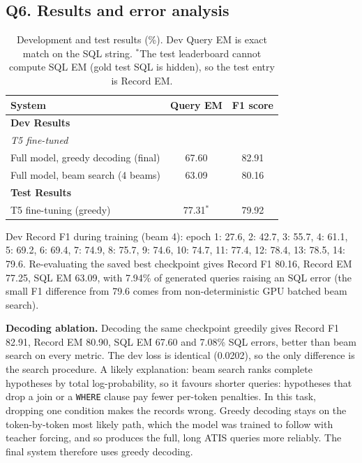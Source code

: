 \documentclass[11pt]{article}
\begin{document}
\subsection*{Q6. Results and error analysis}
\begin{table}[H]
\centering
\begin{tabular}{lcc}
\toprule
System & Query EM & F1 score \\
\midrule
\multicolumn{3}{l}{\textbf{Dev Results}} \\
\multicolumn{3}{l}{\emph{T5 fine-tuned}} \\
Full model, greedy decoding (final) & 67.60 & 82.91 \\
Full model, beam search (4 beams) & 63.09 & 80.16 \\
\midrule
\multicolumn{3}{l}{\textbf{Test Results}} \\
T5 fine-tuning (greedy) & 77.31$^*$ & 79.92 \\
\bottomrule
\end{tabular}
\caption{Development and test results (\%). Dev Query EM is exact match on the SQL string. $^*$The test leaderboard
cannot compute SQL EM (gold test SQL is hidden), so the test entry is Record EM.}
\end{table}

\noindent Dev Record F1 during training (beam 4):
epoch 1: 27.6, 2: 42.7, 3: 55.7, 4: 61.1, 5: 69.2, 6: 69.4, 7: 74.9, 8: 75.7, 9: 74.6, 10: 74.7, 11: 77.4,
12: 78.4, 13: 78.5, 14: 79.6.
Re-evaluating the saved best checkpoint gives Record F1 80.16, Record EM 77.25, SQL EM 63.09, with 7.94\% of
generated queries raising an SQL error (the small F1 difference from 79.6 comes from non-deterministic GPU batched beam search).

\noindent\textbf{Decoding ablation.} Decoding the same checkpoint greedily gives Record F1 82.91, Record EM 80.90,
SQL EM 67.60 and 7.08\% SQL errors, better than beam search on every metric. The dev loss is identical (0.0202),
so the only difference is the search procedure. A likely explanation: beam search ranks complete hypotheses by total log-probability, so it
favours shorter queries: hypotheses that drop a join or a \texttt{WHERE} clause pay fewer per-token penalties.
In this task, dropping one condition makes the records wrong. Greedy decoding stays on the token-by-token
most likely path, which the model was trained to follow with teacher forcing, and so produces the full,
long ATIS queries more reliably. The final system therefore uses greedy decoding.
\end{document}
